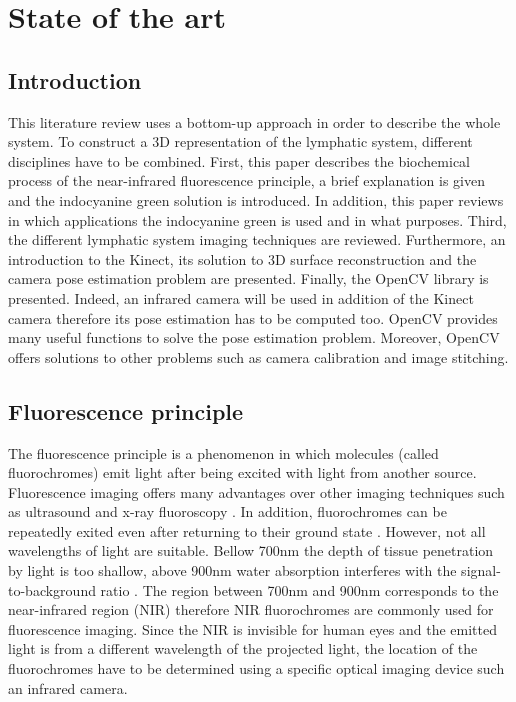 \chapter[State of the art]{State of the art}
\section{Introduction}
This literature review uses a bottom-up approach in order to describe the whole system. To construct a 3D representation of the lymphatic system, different disciplines have to be combined. First, this paper describes the biochemical process of the near-infrared fluorescence principle, a brief explanation is given and the indocyanine green solution is introduced. In addition, this paper reviews in which applications the indocyanine green is used and in what purposes. Third, the different lymphatic system imaging techniques are reviewed. Furthermore, an introduction to the Kinect, its solution to 3D surface reconstruction and the camera pose estimation problem are presented. Finally, the OpenCV library is presented. Indeed, an infrared camera will be used in addition of the Kinect camera therefore its pose estimation has to be computed too. OpenCV provides many useful functions to solve the pose estimation problem. Moreover, OpenCV offers solutions to other problems such as camera calibration and image stitching.

\section{Fluorescence principle}
The fluorescence principle is a phenomenon in which molecules (called fluorochromes) emit light after being excited with light from another source. Fluorescence imaging offers many advantages over other imaging techniques such as ultrasound and x-ray fluoroscopy \cite{troyan_flare_2009}. In addition, fluorochromes can be repeatedly exited even after returning to their ground state \cite{marshall_near-infrared_2010}. However, not all wavelengths of light are suitable. Bellow 700nm the depth of tissue penetration by light is too shallow, above 900nm water absorption interferes with the signal-to-background ratio \cite{kovar_systematic_2007}. The region between 700nm and 900nm corresponds to the near-infrared region (NIR) therefore NIR fluorochromes are commonly used for fluorescence imaging. 
Since the NIR is invisible for human eyes and the emitted light is from a different wavelength of the projected light, the location of the fluorochromes have to be determined using a specific optical imaging device such an infrared camera.\\

